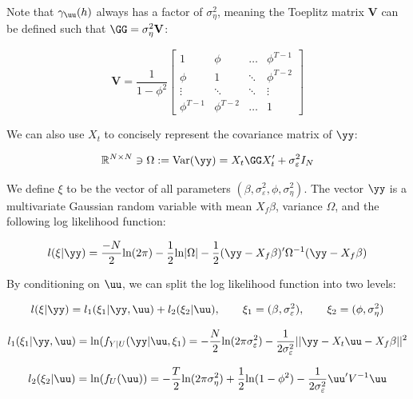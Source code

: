 Note that $\gamma_\uu(h)$ always has a factor of $\sigma_\eta^2$, meaning the Toeplitz matrix $\mathbf{V}$ can be defined such that $\GG = \sigma_\eta^2 \mathbf{V}$:

\begin{equation}
    \label{eq:V}
    \mathbf{V} = \frac{1}{1-\phi^2}\left[\begin{array}{cccc}
        1 &\phi & \dots & \phi^{T-1} \\
       \phi &  1  & \ddots & \phi^{T-2}\\
       \vdots & \ddots & \ddots & \vdots \\
       \phi^{T-1} & \phi^{T-2} & \dots & 1
    \end{array}\right]
\end{equation}

We can also use $X_t$ to concisely represent the covariance matrix of $\yy$:

\begin{equation}
    \label{eq:cov_y}
    \mathbb{R}^{N \times N} \ni\Omega:= \text{Var}(\yy) = X_t\GG X_t' + \sigma_\varepsilon^2I_N
\end{equation}

We define $\xi$ to be the vector of all parameters $(\beta,\sigma_\varepsilon^2,\phi, \sigma_\eta^2)$. The vector $\yy$ is a multivariate Gaussian random variable with mean $X_f\beta$, variance $\Omega$, and the following log likelihood function:

\begin{equation}
    \label{ll_marginal}
    l(\xi|\yy) = \frac{-N}{2}\text{ln}(2\pi) -\frac{1}{2}\text{ln}|\Omega| - \frac{1}{2}(\yy-X_f\beta)'\Omega^{-1}(\yy - X_f\beta)
\end{equation}


By conditioning on ${\uu}$, we can split the log likelihood function into two levels:

$$l(\xi|\yy) =  l_1(\xi_1|\yy,\uu) + l_2(\xi_2|\uu), \qquad \xi_1 = (\beta,\sigma_\varepsilon^2), \qquad \xi_2 = (\phi,\sigma_\eta^2)$$

\begin{equation}
    \label{ll_level1}
    l_1(\xi_1|\yy,\uu) = \text{ln}(f_{Y|U}(\yy|\uu, \xi_1) = -\frac{N}{2}\text{ln}(2\pi\sigma_\varepsilon^2) -\frac{1}{2\sigma_\varepsilon^2}||\yy - X_t\uu - X_f\beta||^2
\end{equation}

\begin{equation}
    \label{ll_level2}
    l_2(\xi_2|\uu) = \text{ln}(f_U(\uu)) = -\frac{T}{2}\text{ln}(2\pi\sigma_\eta^2) + \frac{1}{2}\text{ln}(1-\phi^2) -\frac{1}{2\sigma_\varepsilon^2}\uu'V^{-1}\uu
\end{equation}

